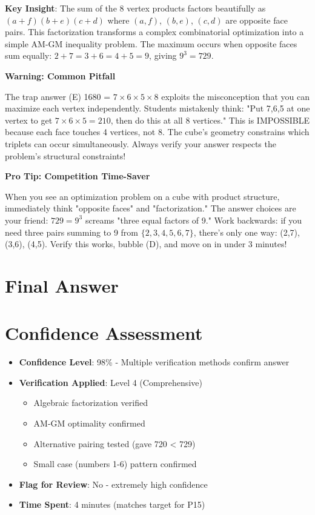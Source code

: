 \documentclass[]{article}
\begin{document}
\begin{keyinsightbox}
\textbf{Key Insight}: The sum of the 8 vertex products factors beautifully as $(a+f)(b+e)(c+d)$ where $(a,f)$, $(b,e)$, $(c,d)$ are opposite face pairs. This factorization transforms a complex combinatorial optimization into a simple AM-GM inequality problem. The maximum occurs when opposite faces sum equally: $2+7=3+6=4+5=9$, giving $9^3 = 729$.
\end{keyinsightbox}

\begin{warningbox}
\textbf{Warning: Common Pitfall}

The trap answer (E) 1680 = $7 \times 6 \times 5 \times 8$ exploits the misconception that you can maximize each vertex independently. Students mistakenly think: "Put 7,6,5 at one vertex to get $7 \times 6 \times 5 = 210$, then do this at all 8 vertices." This is IMPOSSIBLE because each face touches 4 vertices, not 8. The cube's geometry constrains which triplets can occur simultaneously. Always verify your answer respects the problem's structural constraints!
\end{warningbox}

\begin{tipbox}
\textbf{Pro Tip: Competition Time-Saver}

When you see an optimization problem on a cube with product structure, immediately think "opposite faces" and "factorization." The answer choices are your friend: $729 = 9^3$ screams "three equal factors of 9." Work backwards: if you need three pairs summing to 9 from $\{2,3,4,5,6,7\}$, there's only one way: (2,7), (3,6), (4,5). Verify this works, bubble (D), and move on in under 3 minutes!
\end{tipbox}

\section*{Final Answer}

\section*{Confidence Assessment}
\begin{itemize}[leftmargin=*]
    \item \textbf{Confidence Level}: 98\% - Multiple verification methods confirm answer
    \item \textbf{Verification Applied}: Level 4 (Comprehensive)
    \begin{itemize}
        \item Algebraic factorization verified
        \item AM-GM optimality confirmed
        \item Alternative pairing tested (gave 720 < 729)
        \item Small case (numbers 1-6) pattern confirmed
    \end{itemize}
    \item \textbf{Flag for Review}: No - extremely high confidence
    \item \textbf{Time Spent}: 4 minutes (matches target for P15)
\end{itemize}
\end{document}
